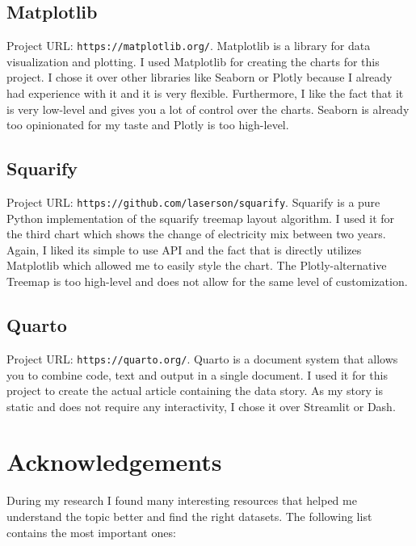 \documentclass{article}
\begin{document}
\subsection{Matplotlib}
Project URL: \texttt{https://matplotlib.org/}.\newline
Matplotlib is a library for data visualization and plotting.
I used Matplotlib for creating the charts for this project.
I chose it over other libraries like Seaborn or Plotly because I already had experience with it and it is very flexible.
Furthermore, I like the fact that it is very low-level and gives you a lot of control over the charts.
Seaborn is already too opinionated for my taste and Plotly is too high-level.

\subsection{Squarify}
Project URL: \texttt{https://github.com/laserson/squarify}.\newline
Squarify is a pure Python implementation of the squarify treemap layout algorithm.
I used it for the third chart which shows the change of electricity mix between two years.
Again, I liked its simple to use API and the fact that is directly utilizes Matplotlib which allowed me to easily style the chart.
The Plotly-alternative Treemap is too high-level and does not allow for the same level of customization.

\subsection{Quarto}
Project URL: \texttt{https://quarto.org/}.\newline
Quarto is a document system that allows you to combine code, text and output in a single document.
I used it for this project to create the actual article containing the data story.
As my story is static and does not require any interactivity, I chose it over Streamlit or Dash.

\newpage

\section{Acknowledgements}

During my research I found many interesting resources that helped me understand the topic better and find the right datasets.
The following list contains the most important ones:
\end{document}
